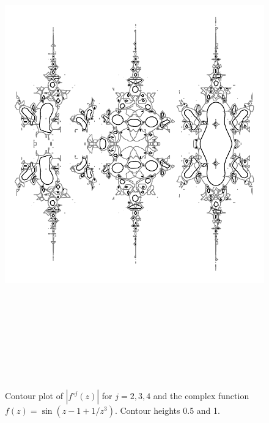 \documentclass[12pt, a4paper]{amsart}
\begin{document}
\begin{figure}[!ht]
\includegraphics[width=160mm, height=210mm, angle=180]{images/indian_caterpillar.pdf}
\caption{
Contour plot of $|f^{\circ j}(z)|$ for $j = 2, 3, 4$ and the complex function $f(z) = \sin(z - 1 + 1/z^3)$.
Contour heights 0.5 and 1.
}
\end{figure}
\pagebreak
\end{document}
